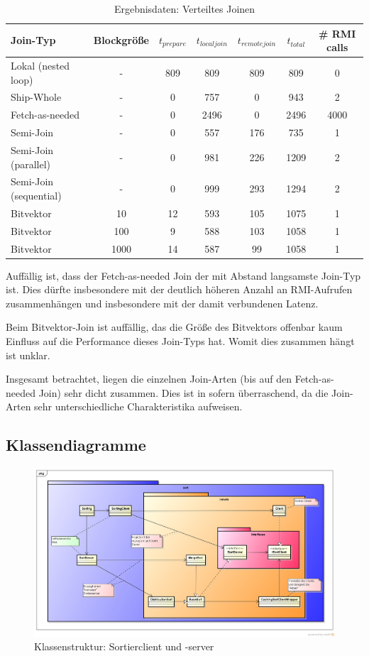 \documentclass[fontsize=12pt,a4paper,headinclude=no,headings=small]{scrartcl}
\begin{document}
\begin{table}[htp]
\begin{tabularx}{\textwidth}{ |X|c|c|c|c|c|c| }
\hline
Join-Typ & Blockgröße & $t_{prepare}$ & $t_{localjoin}$ & $t_{remotejoin}$  & $t_{total}$ & \# RMI calls \\
\hline
Lokal (nested loop) & - & 809 & 809 & 809 & 809 & 0 \\
Ship-Whole & - & 0 & 757 & 0 & 943 & 2 \\
Fetch-as-needed & - & 0 & 2496 & 0 & 2496 & 4000 \\
Semi-Join & - & 0 & 557 & 176 & 735 & 1 \\
Semi-Join (parallel) & - & 0 & 981 & 226 & 1209 & 2 \\
Semi-Join (sequential) & - & 0 & 999 & 293 & 1294 & 2 \\
Bitvektor & 10 & 12 & 593 & 105 & 1075 & 1 \\
Bitvektor & 100 & 9 & 588 & 103 & 1058 & 1 \\
Bitvektor & 1000 & 14 & 587 & 99 & 1058 & 1 \\
\hline
\end{tabularx}
\caption{Ergebnisdaten: Verteiltes Joinen}
\end{table}
Auffällig ist, dass der Fetch-as-needed Join der mit Abstand langsamste Join-Typ ist. Dies dürfte insbesondere mit der deutlich höheren Anzahl an RMI-Aufrufen zusammenhängen und insbesondere mit der damit verbundenen Latenz.

Beim Bitvektor-Join ist auffällig, das die Größe des Bitvektors offenbar kaum Einfluss auf die Performance dieses Join-Typs hat. Womit dies zusammen hängt ist unklar. 

Insgesamt betrachtet, liegen die einzelnen Join-Arten (bis auf den Fetch-as-needed Join) sehr dicht zusammen. Dies ist in sofern überraschend, da die Join-Arten sehr unterschiedliche Charakteristika aufweisen.

\begin{appendix}
\section{Klassendiagramme}
\begin{figure}[H]
	\centering
 	\includegraphics[width=\textwidth]{Klassenstruktur.png}
	\caption{Klassenstruktur: Sortierclient und -server}
\end{figure}
\end{appendix}
\end{document}

